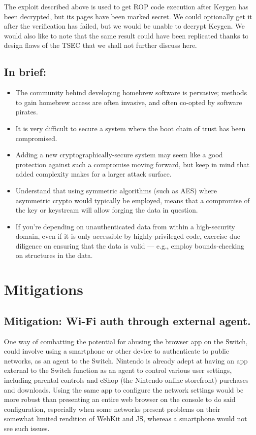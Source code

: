 \documentclass[journal]{IEEEtran}
\begin{document}
The exploit described above is used to get ROP code execution after Keygen has been
decrypted, but its pages have been marked secret. We could optionally get it 
after the verification has failed, but we would be unable to decrypt Keygen. We
would also like to note that the same result could have been replicated thanks
to design flaws of the TSEC that we shall not further discuss here.

\subsection*{In brief:}
\begin{itemize}
\item The community behind developing homebrew software is pervasive; methods to gain homebrew
access are often invasive, and often co-opted by software pirates.
\item It is very difficult to secure a system where the boot chain of trust has been compromised.
\item Adding a new cryptographically-secure system may seem like a good protection against such a
compromise moving forward, but keep in mind that added complexity makes for a larger attack surface.
\item Understand that using symmetric algorithms (such as AES) where asymmetric crypto would
typically be employed, means that a compromise of the key or keystream will allow forging the data
in question.
\item If you're depending on unauthenticated data from within a high-security domain, even if it
is only accessible by highly-privileged code, exercise due
diligence on ensuring that the data is valid --- e.g., employ bounds-checking on structures in the
data.
\end{itemize}

\iffalse
\section{Mitigations}

\subsection{Mitigation: Wi-Fi auth through external agent.}
One way of combatting the potential for abusing the browser app on the Switch, could involve
using a smartphone or other device to authenticate to public networks, as an agent to the Switch.
Nintendo is already adept at having an app external to the Switch function as an agent to control
various user settings, including parental controls and eShop (the Nintendo online storefront)
purchases and downloads. Using the same app to configure the network settings would be more robust
than presenting an entire web browser on the console to do said configuration, especially when
some networks present problems on their somewhat limited rendition of WebKit and JS, whereas a
smartphone would not see such issues.
\end{document}

